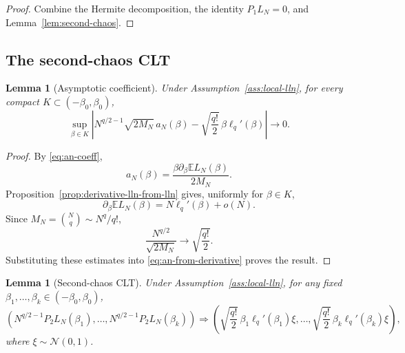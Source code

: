 \documentclass[11pt]{article}
\newtheorem{lemma}[theorem]{Lemma}
\newcommand{\E}{\mathbb{E}}
\newcommand{\N}{\mathcal{N}}
\begin{document}
\begin{proof}
  Combine the Hermite decomposition, the identity $P_1L_N=0$, and
  Lemma~\ref{lem:second-chaos}.
\end{proof}

\subsection{The second-chaos CLT}

\begin{lemma}[Asymptotic coefficient]\label{lem:coefficient-limit}
  Under Assumption~\ref{ass:local-lln}, for every compact
  $K\subset(-\beta_0,\beta_0)$,
  \begin{equation}\label{eq:coefficient-limit}
    \sup_{\beta\in K}
    \left|
      N^{q/2-1}\sqrt{2M_N}\,a_N(\beta)
      -
      \sqrt{\frac{q!}{2}}\,\beta\ell_q'(\beta)
    \right|
    \to0.
  \end{equation}
\end{lemma}

\begin{proof}
  By \eqref{eq:an-coeff},
  \begin{equation}\label{eq:an-from-derivative}
    a_N(\beta)=\frac{\beta\partial_\beta\E L_N(\beta)}{2M_N}.
  \end{equation}
  Proposition~\ref{prop:derivative-lln-from-lln} gives, uniformly for
  $\beta\in K$,
  \begin{equation}\label{eq:derivative-asymptotic}
    \partial_\beta\E L_N(\beta)=N\ell_q'(\beta)+o(N).
  \end{equation}
  Since $M_N=\binom{N}{q}\sim N^q/q!$,
  \begin{equation}\label{eq:Nn-asymptotic}
    \frac{N^{q/2}}{\sqrt{2M_N}}\to\sqrt{\frac{q!}{2}}.
  \end{equation}
  Substituting these estimates into \eqref{eq:an-from-derivative} proves the
  result.
\end{proof}

\begin{lemma}[Second-chaos CLT]\label{lem:p2-clt}
  Under Assumption~\ref{ass:local-lln}, for any fixed
  $\beta_1,\ldots,\beta_k\in(-\beta_0,\beta_0)$,
  \begin{equation}\label{eq:p2-clt}
    \left(
      N^{q/2-1}P_2L_N(\beta_1),\ldots,
      N^{q/2-1}P_2L_N(\beta_k)
    \right)
    \Rightarrow
    \left(
      \sqrt{\frac{q!}{2}}\,\beta_1\ell_q'(\beta_1)\xi,
      \ldots,
      \sqrt{\frac{q!}{2}}\,\beta_k\ell_q'(\beta_k)\xi
    \right),
  \end{equation}
  where $\xi\sim\N(0,1)$.
\end{lemma}
\end{document}
